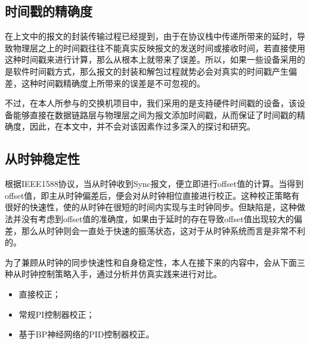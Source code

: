\subsection{时间戳的精确度}
\label{sec:1588_problem_2}
在上文中的报文的封装传输过程已经提到，由于在协议栈中传递所带来的延时，导致物理层之上的时间戳往往不能真实反映报文的发送时间或接收时间，若直接使用这种时间戳来进行计算，那么从根本上就带来了误差。所以，如果一些设备采用的是软件时间戳方式，那么报文的封装和解包过程就势必会对真实的时间戳产生偏差，这种时间戳精确度上所带来的误差是不可忽视的。

不过，在本人所参与的交换机项目中，我们采用的是支持硬件时间戳的设备，该设备能够直接在数据链路层与物理层之间为报文添加时间戳，从而保证了时间戳的精确度，因此，在本文中，并不会对该因素作过多深入的探讨和研究。

\subsection{从时钟稳定性}
\label{sec:1588_problem_3}
根据IEEE1588协议，当从时钟收到Sync报文，便立即进行offset值的计算。当得到offset值，即主从时钟偏差后，便会对从时钟相位直接进行校正。这种校正策略有很好的快速性，使的从时钟在很短的时间内实现与主时钟同步。但缺陷是，这种做法并没有考虑到offset值的准确度，如果由于延时的存在导致offset值出现较大的偏差，那么从时钟则会一直处于快速的振荡状态，这对于从时钟系统而言是非常不利的。

为了兼顾从时钟的同步快速性和自身稳定性，本人在接下来的内容中，会从下面三种从时钟控制策略入手，通过分析并仿真实践来进行对比。
\begin{itemize}[noitemsep,topsep=0pt,parsep=0pt,partopsep=0pt]
	\item 直接校正；
	\item 常规PI控制器校正；
	\item 基于BP神经网络的PID控制器校正。
\end{itemize}




